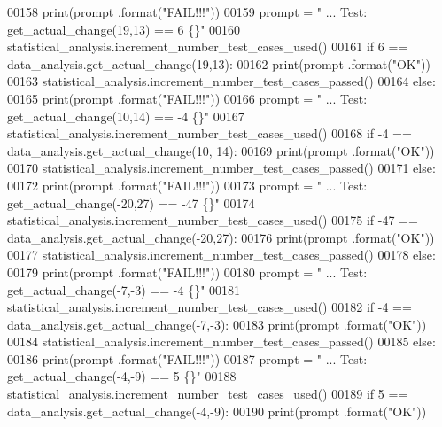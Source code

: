 \begin{DoxyCode}
00158             print(prompt .format(\textcolor{stringliteral}{"FAIL!!!"}))
00159         prompt = \textcolor{stringliteral}{"  ... Test: get\_actual\_change(19,13) == 6         \{\}"}
00160         statistical\_analysis.increment\_number\_test\_cases\_used()
00161         \textcolor{keywordflow}{if} 6 == data\_analysis.get\_actual\_change(19,13):
00162             print(prompt .format(\textcolor{stringliteral}{"OK"}))
00163             statistical\_analysis.increment\_number\_test\_cases\_passed()
00164         \textcolor{keywordflow}{else}:
00165             print(prompt .format(\textcolor{stringliteral}{"FAIL!!!"}))
00166         prompt = \textcolor{stringliteral}{"  ... Test: get\_actual\_change(10,14) == -4        \{\}"}
00167         statistical\_analysis.increment\_number\_test\_cases\_used()
00168         \textcolor{keywordflow}{if} -4 == data\_analysis.get\_actual\_change(10, 14):
00169             print(prompt .format(\textcolor{stringliteral}{"OK"}))
00170             statistical\_analysis.increment\_number\_test\_cases\_passed()
00171         \textcolor{keywordflow}{else}:
00172             print(prompt .format(\textcolor{stringliteral}{"FAIL!!!"}))
00173         prompt = \textcolor{stringliteral}{"  ... Test: get\_actual\_change(-20,27) == -47      \{\}"}
00174         statistical\_analysis.increment\_number\_test\_cases\_used()
00175         \textcolor{keywordflow}{if} -47 == data\_analysis.get\_actual\_change(-20,27):
00176             print(prompt .format(\textcolor{stringliteral}{"OK"}))
00177             statistical\_analysis.increment\_number\_test\_cases\_passed()
00178         \textcolor{keywordflow}{else}:
00179             print(prompt .format(\textcolor{stringliteral}{"FAIL!!!"}))
00180         prompt = \textcolor{stringliteral}{"  ... Test: get\_actual\_change(-7,-3) == -4        \{\}"}
00181         statistical\_analysis.increment\_number\_test\_cases\_used()
00182         \textcolor{keywordflow}{if} -4 == data\_analysis.get\_actual\_change(-7,-3):
00183             print(prompt .format(\textcolor{stringliteral}{"OK"}))
00184             statistical\_analysis.increment\_number\_test\_cases\_passed()
00185         \textcolor{keywordflow}{else}:
00186             print(prompt .format(\textcolor{stringliteral}{"FAIL!!!"}))
00187         prompt = \textcolor{stringliteral}{"  ... Test: get\_actual\_change(-4,-9) == 5         \{\}"}
00188         statistical\_analysis.increment\_number\_test\_cases\_used()
00189         \textcolor{keywordflow}{if} 5 == data\_analysis.get\_actual\_change(-4,-9):
00190             print(prompt .format(\textcolor{stringliteral}{"OK"}))

\end{DoxyCode}
